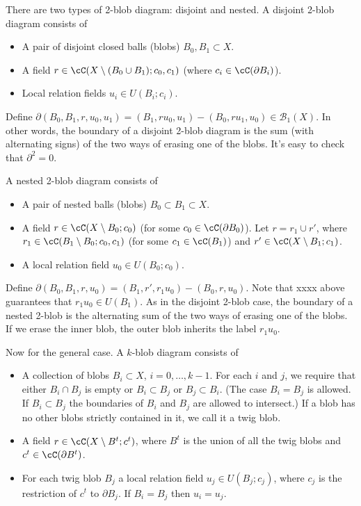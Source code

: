 \documentclass[11pt,leqno]{amsart}
\def\bc{{\mathcal B}}
\def\bd{\partial}
\def\sub{\subset}
\def\setmin{\setminus}
\begin{document}
There are two types of 2-blob diagram: disjoint and nested.
A disjoint 2-blob diagram consists of
\begin{itemize}
\item A pair of disjoint closed balls (blobs) $B_0, B_1 \sub X$.
\item A field $r \in \cC(X \setmin (B_0 \cup B_1); c_0, c_1)$
(where $c_i \in \cC(\bd B_i)$).
\item Local relation fields $u_i \in U(B_i; c_i)$.
\end{itemize}
Define $\bd(B_0, B_1, r, u_0, u_1) = (B_1, ru_0, u_1) - (B_0, ru_1, u_0) \in \bc_1(X)$.
In other words, the boundary of a disjoint 2-blob diagram
is the sum (with alternating signs)
of the two ways of erasing one of the blobs.
It's easy to check that $\bd^2 = 0$.

A nested 2-blob diagram consists of
\begin{itemize}
\item A pair of nested balls (blobs) $B_0 \sub B_1 \sub X$.
\item A field $r \in \cC(X \setmin B_0; c_0)$
(for some $c_0 \in \cC(\bd B_0)$).
Let $r = r_1 \cup r'$, where $r_1 \in \cC(B_1 \setmin B_0; c_0, c_1)$
(for some $c_1 \in \cC(B_1)$) and
$r' \in \cC(X \setmin B_1; c_1)$.
\item A local relation field $u_0 \in U(B_0; c_0)$.
\end{itemize}
Define $\bd(B_0, B_1, r, u_0) = (B_1, r', r_1u_0) - (B_0, r, u_0)$.
Note that xxxx above guarantees that $r_1u_0 \in U(B_1)$.
As in the disjoint 2-blob case, the boundary of a nested 2-blob is the alternating
sum of the two ways of erasing one of the blobs.
If we erase the inner blob, the outer blob inherits the label $r_1u_0$.

Now for the general case.
A $k$-blob diagram consists of
\begin{itemize}
\item A collection of blobs $B_i \sub X$, $i = 0, \ldots, k-1$.
For each $i$ and $j$, we require that either $B_i \cap B_j$ is empty or
$B_i \sub B_j$ or $B_j \sub B_i$.
(The case $B_i = B_j$ is allowed.
If $B_i \sub B_j$ the boundaries of $B_i$ and $B_j$ are allowed to intersect.)
If a blob has no other blobs strictly contained in it, we call it a twig blob.
\item A field $r \in \cC(X \setmin B^t; c^t)$,
where $B^t$ is the union of all the twig blobs and $c^t \in \cC(\bd B^t)$.
\item For each twig blob $B_j$ a local relation field $u_j \in U(B_j; c_j)$,
where $c_j$ is the restriction of $c^t$ to $\bd B_j$.
If $B_i = B_j$ then $u_i = u_j$.
\end{itemize}
\end{document}
